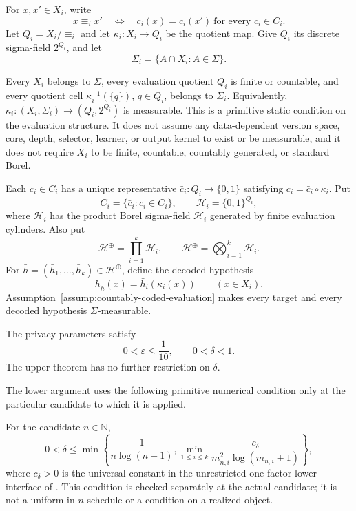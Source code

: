 For \(x,x'\in X_i\), write
\[
x\equiv_i x'
\quad\Longleftrightarrow\quad
c_i(x)=c_i(x')\ \text{for every }c_i\in C_i.
\]
Let \(Q_i=X_i/{\equiv_i}\) and let
\(\kappa_i:X_i\to Q_i\) be the quotient map.  Give \(Q_i\) its discrete
sigma-field \(2^{Q_i}\), and let
\[
\Sigma_i=\{A\cap X_i:A\in\Sigma\}.
\]

\begin{assumption}
\label{assump:countably-coded-evaluation}
Every \(X_i\) belongs to \(\Sigma\), every evaluation quotient \(Q_i\)
is finite or countable, and every quotient cell
\(\kappa_i^{-1}(\{q\})\), \(q\in Q_i\), belongs to \(\Sigma_i\).
Equivalently,
\(\kappa_i:(X_i,\Sigma_i)\to(Q_i,2^{Q_i})\) is measurable.
This is a primitive static condition on the evaluation structure.  It
does not assume any data-dependent version space, core, depth, selector,
learner, or output kernel to exist or be measurable, and it does not
require \(X_i\) to be finite, countable, countably generated, or
standard Borel.
\end{assumption}

Each \(c_i\in C_i\) has a unique representative
\(\bar c_i:Q_i\to\{0,1\}\) satisfying
\(c_i=\bar c_i\circ\kappa_i\).  Put
\[
\bar C_i=\{\bar c_i:c_i\in C_i\},
\qquad
\mathcal H_i=\{0,1\}^{Q_i},
\]
where \(\mathcal H_i\) has the product Borel sigma-field
\(\mathscr H_i\) generated by finite evaluation cylinders.  Also put
\[
\mathcal H^\oplus=\prod_{i=1}^k\mathcal H_i,
\qquad
\mathscr H^\oplus=\bigotimes_{i=1}^k\mathscr H_i.
\]
For \(\bar h=(\bar h_1,\ldots,\bar h_k)\in\mathcal H^\oplus\), define
the decoded hypothesis
\begin{equation}\label{eq:setup-decoder}
h_{\bar h}(x)=\bar h_i(\kappa_i(x))
\qquad(x\in X_i).
\end{equation}
Assumption~\ref{assump:countably-coded-evaluation} makes every target
and every decoded hypothesis \(\Sigma\)-measurable.

\begin{assumption}
\label{assump:global-privacy-range}
The privacy parameters satisfy
\[
0<\varepsilon\le\frac1{10},
\qquad
0<\delta<1.
\]
The upper theorem has no further restriction on \(\delta\).
\end{assumption}

The lower argument uses the following primitive numerical condition
only at the particular candidate to which it is applied.

\begin{assumption}
\label{assump:candidate-delta-budget}
For the candidate \(n\in\mathbb N\),
\begin{equation}\label{eq:setup-candidate-delta-budget}
0<\delta\le
\min\left\{
\frac1{n\log(n+1)},
\min_{1\le i\le k}
\frac{c_\delta}
{m_{n,i}^2\log(m_{n,i}+1)}
\right\},
\end{equation}
where \(c_\delta>0\) is the universal constant in the unrestricted
one-factor lower interface of
\citet{alonLivniMalliarisMoran2019}.  This condition is checked
separately at the actual candidate; it is not a uniform-in-\(n\)
schedule or a condition on a realized object.
\end{assumption}

